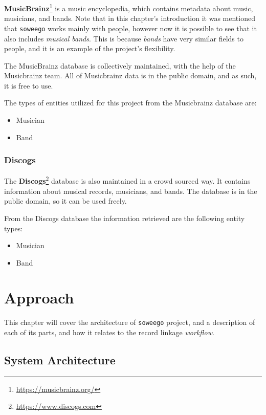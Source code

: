 \documentclass[epsfig,a4paper,11pt,titlepage,twoside,openany]{book}
\newcommand{\footurl}[1]{\footnote{\url{#1}}}
\newcommand{\soweego}[0]{\texttt{soweego}\xspace}
\begin{document}
\textbf{MusicBrainz}\footurl{https://musicbrainz.org/} is a music encyclopedia, which contains metadata about music, musicians, and bands. 
Note that in this chapter’s introduction it was mentioned that \texttt{soweego} works mainly with people, however now it is possible to see that it also includes \textit{musical bands}. This is because \textit{bands} have very similar fields to people, and it is an example of the project's flexibility.

The MusicBrainz database is collectively maintained, with the help of the Musicbrainz team. All of Musicbrainz data is in the public domain, and as such, it is free to use.

The types of entities utilized for this project from the Musicbrainz database are:

\begin{itemize}
\item Musician
\item Band
\end{itemize}


\subsection{Discogs}
\label{sec:catalog-discogs}


The \textbf{Discogs}\footurl{https://www.discogs.com} database is also maintained in a crowd sourced way. It contains information about musical records, musicians, and bands. The database is in the public domain, so it can be used freely.

From the Discogs database the information retrieved are the following entity types:

\begin{itemize}
\item Musician
\item Band
\end{itemize}


\chapter{Approach} 
\label{chap:approach}


This chapter will cover the architecture of \soweego project, and a description of each of its parts, and how it relates to the record linkage \textit{workflow}.

\section{System Architecture}
\label{sec:system-architecture}
\end{document}
